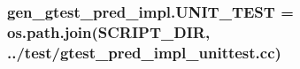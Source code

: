 \subsubsection[{\texorpdfstring{U\+N\+I\+T\+\_\+\+T\+E\+ST}{UNIT_TEST}}]{\setlength{\rightskip}{0pt plus 5cm}gen\+\_\+gtest\+\_\+pred\+\_\+impl.\+U\+N\+I\+T\+\_\+\+T\+E\+ST = os.\+path.\+join({\bf S\+C\+R\+I\+P\+T\+\_\+\+D\+IR}, \textquotesingle{}../test/gtest\+\_\+pred\+\_\+impl\+\_\+unittest.\+cc\textquotesingle{})}\hypertarget{namespacegen__gtest__pred__impl_a8c1cb8e87c4bd84edbb958f73b7df200}{}\label{namespacegen__gtest__pred__impl_a8c1cb8e87c4bd84edbb958f73b7df200}
